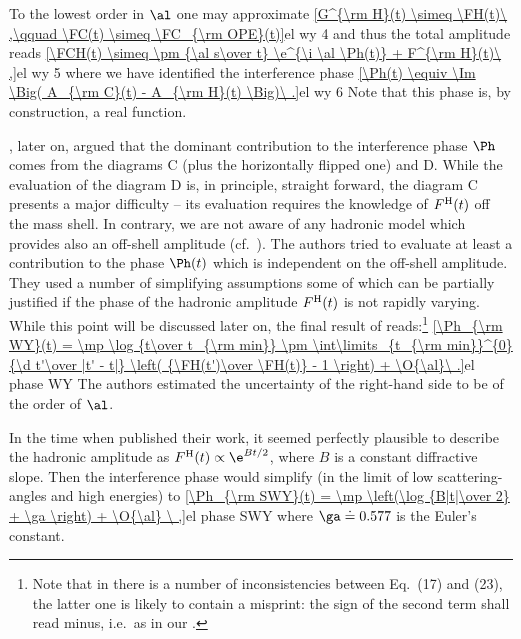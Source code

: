 To the lowest order in $\al$ one may approximate
\eqref{G^{\rm H}(t) \simeq \FH(t)\ ,\qquad \FC(t) \simeq \FC_{\rm OPE}(t)}{el wy 4}
and thus the total amplitude reads
\eqref{\FCH(t) \simeq \pm {\al s\over t} \e^{\i \al \Ph(t)} + F^{\rm H}(t)\ ,}{el wy 5}
where we have identified the interference phase
\eqref{\Ph(t) \equiv \Im \Big( A_{\rm C}(t) - A_{\rm H}(t) \Big)\ .}{el wy 6}
Note that this phase is, by construction, a real function.


\WY, later on, argued that the dominant contribution to the interference phase $\Ph$ comes from the diagrams  C (plus the horizontally flipped one) and D. While the evaluation of the diagram D is, in principle, straight forward, the diagram C presents a major difficulty -- its evaluation requires the knowledge of $F^{\rm H}(t)$ off the mass shell. In contrary, we are not aware of any hadronic model which provides also an off-shell amplitude (cf.~). The authors tried to evaluate at least a contribution to the phase $\Ph(t)$ which is independent on the off-shell amplitude. They used a number of simplifying assumptions some of which can be partially justified if the phase of the hadronic amplitude $F^{\rm H}(t)$ is not rapidly varying. While this point will be discussed later on, the final result of \WY{} reads:\footnote{%
Note that in  there is a number of inconsistencies between Eq.~(17) and (23), the latter one is likely to contain a misprint: the sign of the second term shall read minus, i.e.~as in our .
}
\eqref{\Ph_{\rm WY}(t) = \mp \log {t\over t_{\rm min}} \pm \int\limits_{t_{\rm min}}^{0} {\d t'\over |t' - t|} \left( {\FH(t')\over \FH(t)} - 1 \right) + \O{\al}\ .}{el phase WY}
The authors estimated the uncertainty of the right-hand side to be of the order of $\al$.

In the time when \WY{} published their work, it seemed perfectly plausible to describe the hadronic amplitude as $\FH(t) \propto \e^{Bt/2}$, where $B$ is a constant diffractive slope. Then the interference phase would simplify (in the limit of low scattering-angles and high energies) to
\eqref{\Ph_{\rm SWY}(t) = \mp \left(\log {B|t|\over 2} + \ga \right) + \O{\al} \ ,}{el phase SWY}
where $\ga \doteq 0.577$ is the Euler's constant.

